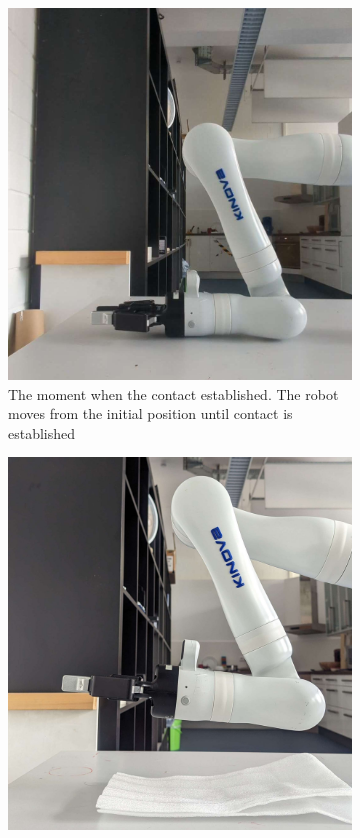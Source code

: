 \documentclass[report.tex]{subfiles}
\begin{document}
    \begin{figure}[H]
        \captionsetup[subfigure]{justification=centering}
        \begin{subfigure}{0.49\textwidth}
                \centering
                \includegraphics[width=\linewidth]{images/us1_contact2.jpg}
                \caption{The moment when the contact established. The robot moves from the initial position until contact is established}
                \label{fig:us1_con}
            \end{subfigure}
            \begin{subfigure}{0.49\textwidth}
                \centering
                \includegraphics[width=\linewidth]{images/us1_contactless.jpg}

\end{subfigure}
\end{figure}
\end{document}
